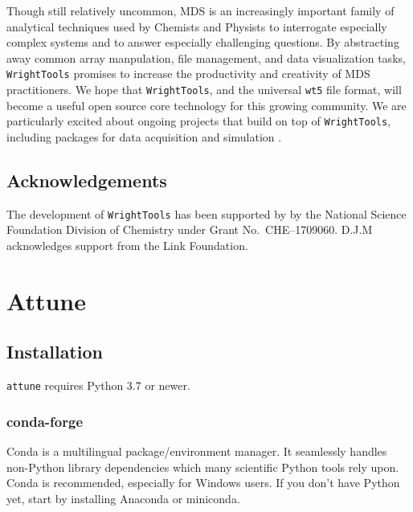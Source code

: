 Though still relatively uncommon, MDS is an increasingly important
family of analytical techniques used by Chemists and Physists to
interrogate especially complex systems and to answer especially
challenging questions. By abstracting away common array manpulation,
file management, and data visualization tasks, \texttt{WrightTools}
promises to increase the productivity and creativity of MDS
practitioners. We hope that \texttt{WrightTools}, and the universal
\texttt{wt5} file format, will become a useful open source core
technology for this growing community. We are particularly excited about
ongoing projects that build on top of \texttt{WrightTools}, including
packages for data acquisition and simulation
\cite{ThompsonBlaiseJonathan2018PyCMDS}\cite{SundenKyleFoster2018a}.

\hypertarget{acknowledgements}{%
\subsection{Acknowledgements}\label{acknowledgements}}

The development of \texttt{WrightTools} has been supported by by the
National Science Foundation Division of Chemistry under Grant
No.~CHE--1709060. D.J.M acknowledges support from the Link Foundation.

\clearpage

\section{Attune}  %


\subsection{Installation}\label{install}

\texttt{attune} requires Python 3.7 or newer.

\hypertarget{conda-forge}{%
\subsubsection{conda-forge}\label{conda-forge}}

Conda\cite{conda} is a multilingual
package/environment manager. It seamlessly handles non-Python library
dependencies which many scientific Python tools rely upon. Conda is
recommended, especially for Windows users. If you don't have Python yet,
start by installing Anaconda\cite{anaconda}
or miniconda\cite{miniconda}.

